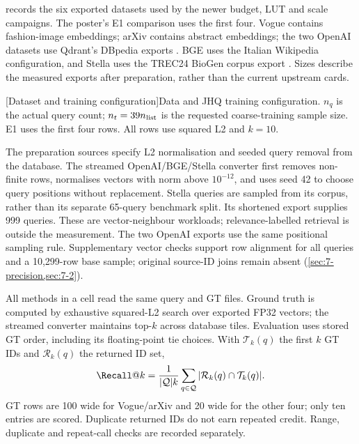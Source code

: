  records the six exported datasets used by the newer
budget, LUT and scale campaigns. The poster's E1 comparison uses the first
four. Vogue contains fashion-image embeddings; arXiv contains abstract
embeddings; the two OpenAI datasets use Qdrant's DBpedia exports
\cite{data_vogue,data_arxiv,data_openai1536,data_openai3072}.
BGE uses the Italian Wikipedia configuration, and Stella uses the
TREC24 BioGen corpus export \cite{data_bge,data_stella}. Sizes describe the
measured exports after preparation, rather than the current upstream cards.

\par\medskip\noindent\begin{minipage}{\linewidth}
\centering\captionsetup{hypcap=false}
[Dataset and training configuration]{Data and JHQ training configuration. $n_q$ is the actual query count;
$n_t=39n_{\rm list}$ is the requested coarse-training sample size. E1 uses
the first four rows. All rows use squared L2 and $k=10$.}
\label{tab:3-data}
\small\setlength{\tabcolsep}{4pt}

\end{minipage}\par\medskip

The preparation sources specify L2 normalisation and seeded query removal
from the database. The streamed OpenAI/BGE/Stella converter first removes
non-finite rows, normalises vectors with norm above $10^{-12}$, and uses
seed 42 to choose query positions without replacement. Stella queries are
sampled from its corpus, rather than its separate 65-query benchmark split.
Its shortened export supplies 999 queries. These are vector-neighbour
workloads; relevance-labelled retrieval is outside the measurement.
The two OpenAI exports use the same positional sampling rule.
Supplementary vector checks support row alignment for all queries and a
10,299-row base sample; original source-ID joins remain absent
(\cref{sec:7-precision,sec:7-2}).

All methods in a cell read the same query and GT files. Ground truth is
computed by exhaustive squared-L2 search over exported FP32 vectors; the
streamed converter maintains top-$k$ across database tiles. Evaluation uses
stored GT order, including its floating-point tie choices. With
$\mathcal T_k(q)$ the first $k$ GT IDs and $\mathcal R_k(q)$ the returned
ID set,
\begin{equation}
\Recall@k=\frac{1}{|\mathcal Q|k}
\sum_{q\in\mathcal Q}|\mathcal R_k(q)\cap\mathcal T_k(q)|.
\label{eq:3-recall}
\end{equation}
GT rows are 100 wide for Vogue/arXiv and 20 wide for the other four;
only ten entries are scored. Duplicate returned IDs do not earn repeated
credit. Range, duplicate and repeat-call checks are recorded separately.

